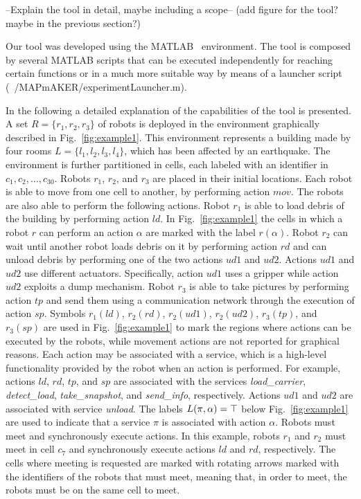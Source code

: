 --Explain the tool in detail, maybe including a scope-- (add figure for the tool? maybe in the previous section?)

Our tool was developed using the MATLAB~\cite{matlab} environment.
The tool is composed by several MATLAB scripts that can be executed independently for reaching certain functions or in a much more suitable way by means of a  launcher script (~/MAPmAKER/experimentLauncher.m).

In the following a detailed explanation of the capabilities of the tool is presented.
A set $R=\{r_1, r_2, r_3 \}$ of robots  is deployed in the environment graphically described in  Fig.~\ref{fig:example1}.
This environment represents a building made by four rooms $L=\{ l_1, l_2, l_3, l_4 \}$, which has been affected by an earthquake.
The environment is further partitioned in cells, each labeled with an identifier in $c_1, c_2, \ldots, c_{30}$.
Robots $r_1$, $r_2$, and $r_3$ are placed in their initial locations.
Each robot is able to move from one cell to another, by performing action $mov$.
The robots are also able to perform the following actions.
Robot $r_1$ is able to load debris of the building by performing action $ld$. 
In Fig.~\ref{fig:example1} the cells in which a robot $r$ can perform an action $\alpha$ are marked with the label $r(\alpha)$.
Robot $r_2$ can wait until another robot loads debris on it by performing action $rd$ and can unload debris by performing one of the two actions $ud1$ and $ud2$. 
Actions $ud1$ and $ud2$ use different actuators.
Specifically, action $ud1$ uses a gripper while action $ud2$ exploits a dump mechanism.
Robot $r_3$ is able to take pictures by performing action $tp$ and send them using a communication network through the execution of action $sp$. 
Symbols $r_1(ld)$, $r_2(rd)$, $r_2(ud1)$, $r_2(ud2)$, $r_3(tp)$, and $r_3(sp)$ are used in Fig.~\ref{fig:example1} to mark the regions where  actions can be executed by the robots, while movement actions are not reported for graphical reasons.
Each action may be associated with a service, which is a high-level functionality provided by the robot when an action is performed.
For example, actions $ld$, $rd$, $tp$, and $sp$  are associated with the services \emph{load\_carrier}, \emph{detect\_load}, \emph{take\_snapshot}, and \emph{send\_info}, respectively.
Actions $ud1$ and $ud2$ are associated with service \emph{unload}.
The labels $L(\pi,\alpha)=\top$ below Fig.~\ref{fig:example1} are used to indicate that a service $\pi$ is associated with  action $\alpha$. 
Robots must meet and  synchronously execute actions. 
In this example, robots $r_1$ and  $r_2$ must meet  in cell $c_7$ and synchronously execute actions $ld$ and $rd$, respectively. 
The cells where meeting is requested are marked with rotating arrows marked with the identifiers of the robots that must meet, meaning that, in order to meet, the robots must be on the same cell to meet.


